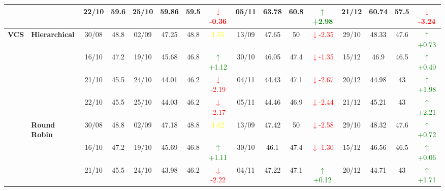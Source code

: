 \documentclass{ieeeaccess}
\begin{document}
{\begin{longtable}{llcc|cccc|cccc|cccc}
&
& 22/10 & 59.6 & 25/10 & 59.86 & 59.5 & \textcolor{red}{\(\downarrow\)-0.36} & 05/11 & 63.78 & 60.8 & \textcolor{green}{\(\uparrow\)+2.98} & 21/12 & 60.74 & 57.5 & \textcolor{red}{\(\downarrow\)-3.24} \\
\midrule



\multirow{12}{*}{\textbf{VCS}} 
& \textbf{Hierarchical}
& 30/08 & 48.8 & 02/09 & 47.25 & 48.8 & \textcolor{yellow}{1.55} & 13/09 & 47.65 & 50 & \textcolor{red}{\(\downarrow\)-2.35} & 29/10 & 48.33 & 47.6 & \textcolor{green}{\(\uparrow\)+0.73} \\

&
& 16/10 & 47.2 & 19/10 & 45.68 & 46.8 & \textcolor{green}{\(\uparrow\)+1.12} & 30/10 & 46.05 & 47.4 & \textcolor{red}{\(\downarrow\)-1.35} & 15/12 & 46.9 & 46.5 & \textcolor{green}{\(\uparrow\)+0.40} \\

&
& 21/10 & 45.5 & 24/10 & 44.01 & 46.2 & \textcolor{red}{\(\downarrow\)-2.19} & 04/11 & 44.43 & 47.1 & \textcolor{red}{\(\downarrow\)-2.67} & 20/12 & 44.98 & 43 & \textcolor{green}{\(\uparrow\)+1.98} \\

&
& 22/10 & 45.5 & 25/10 & 44.03 & 46.2 & \textcolor{red}{\(\downarrow\)-2.17} & 05/11 & 44.46 & 46.9 & \textcolor{red}{\(\downarrow\)-2.44} & 21/12 & 45.21 & 43 & \textcolor{green}{\(\uparrow\)+2.21} \\
\cmidrule(lr){2-16}


& \textbf{Round Robin}
& 30/08 & 48.8 & 02/09 & 47.18 & 48.8 & \textcolor{yellow}{1.62} & 13/09 & 47.42 & 50 & \textcolor{red}{\(\downarrow\)-2.58} & 29/10 & 48.32 & 47.6 & \textcolor{green}{\(\uparrow\)+0.72} \\

&
& 16/10 & 47.2 & 19/10 & 45.69 & 46.8 & \textcolor{green}{\(\uparrow\)+1.11} & 30/10 & 46.1 & 47.4 & \textcolor{red}{\(\downarrow\)-1.30} & 15/12 & 46.56 & 46.5 & \textcolor{green}{\(\uparrow\)+0.06} \\

&
& 21/10 & 45.5 & 24/10 & 43.98 & 46.2 & \textcolor{red}{\(\downarrow\)-2.22} & 04/11 & 47.22 & 47.1 & \textcolor{green}{\(\uparrow\)+0.12} & 20/12 & 44.71 & 43 & \textcolor{green}{\(\uparrow\)+1.71} \\


\end{longtable}}
\end{document}
